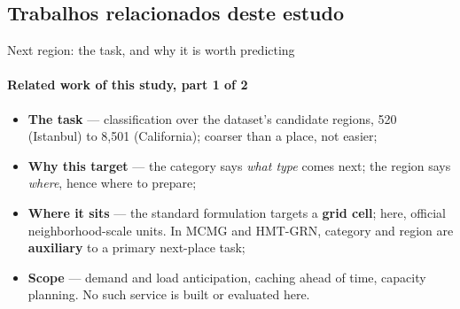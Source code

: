 \documentclass{beamer}
\begin{document}
\subsection{Trabalhos relacionados deste estudo}

\begin{frame}{Next region: the task, and why it is worth predicting}
    \framesubtitle{Related work of this study, part 1 of 2}

    \begin{itemize}\setlength{\itemsep}{4pt}
        \item \textbf{The task} --- classification over the dataset's candidate regions,
              \alert{520 (Istanbul) to 8,501 (California)}; coarser than a place, not easier;
        \item \textbf{Why this target} --- the category says \emph{what type} comes next;
              the region says \emph{where}, hence where to prepare;
        \item \textbf{Where it sits} --- the standard formulation targets a \textbf{grid cell};
              here, official neighborhood-scale units. In MCMG and HMT-GRN, category and region
              are \textbf{auxiliary} to a primary next-place task;
        \item \textbf{Scope} --- demand and load anticipation, caching ahead of time, capacity
              planning. \alert{No such service is built or evaluated here.}
    \end{itemize}
\end{frame}
\end{document}
